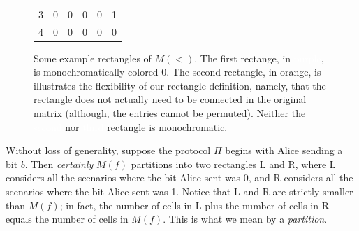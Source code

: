 \documentclass[12pt]{article}
\begin{document}
\begin{figure}[h]
\begin{minipage}{0.25\textwidth}
\begin{tabular}{|l|lllll|}
		3   & 0 & 0 & 0 & 0 & 1 \\
		4   & 0 & 0 & 0 & 0 & 0\\\hline
		\end{tabular}   
	\end{minipage}
	\caption{Some example rectangles of $M(<)$.  The first rectange, in {\colorbox{purple!75}{\textcolor{white}{purple}}}, is monochromatically colored 0.  The second rectangle, in {\colorbox{orange!75}{orange}}, is illustrates the flexibility of our rectangle definition, namely, that the rectangle does not actually need to be connected in the original matrix (although, the entries cannot be permuted).  Neither the {\colorbox{purple!75}{\textcolor{white}{second}}} nor {\colorbox{black!75}{\textcolor{white}{third}}} rectangle is monochromatic.}
\end{figure}

Without loss of generality, 
	suppose the protocol $\Pi$ begins with Alice
	sending a bit $b$.
Then \emph{certainly} $M(f)$ partitions into two rectangles \textsf{L} and \textsf{R},
	where \textsf{L} considers all the scenarios where the bit Alice sent was 0,
	and \textsf{R} considers all the scenarios where the bit Alice sent was 1.
Notice that \textsf{L} and \textsf{R} are strictly smaller than $M(f)$;
	in fact, the number of cells in \textsf{L} plus the number of cells in \textsf{R}
	equals the number of cells in $M(f)$.
	This is what we mean by a \emph{partition}.

\clearpage
\end{document}
